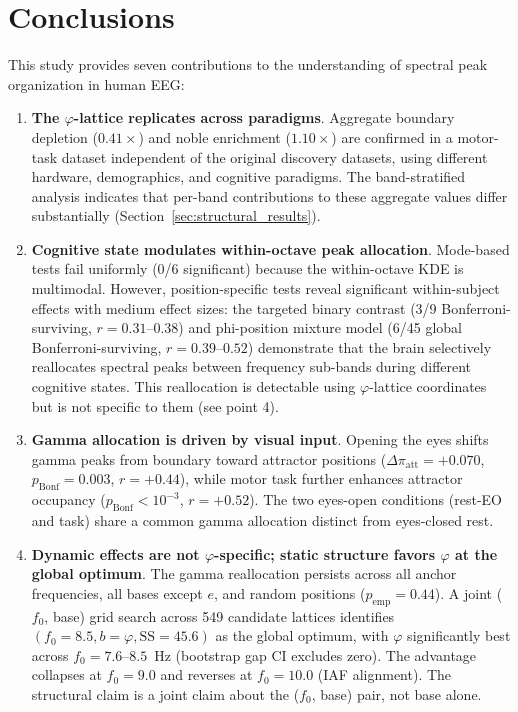 \documentclass[11pt,a4paper]{article}
\newcommand{\phisym}{\varphi}
\newcommand{\fzero}{f_0}
\begin{document}
\section{Conclusions}
\label{sec:conclusions}

This study provides seven contributions to the understanding of spectral peak organization in human EEG:

\begin{enumerate}
    \item \textbf{The $\phisym$-lattice replicates across paradigms}. Aggregate boundary depletion ($0.41\times$) and noble enrichment ($1.10\times$) are confirmed in a motor-task dataset independent of the original discovery datasets, using different hardware, demographics, and cognitive paradigms. The band-stratified analysis indicates that per-band contributions to these aggregate values differ substantially (Section~\ref{sec:structural_results}).

    \item \textbf{Cognitive state modulates within-octave peak allocation}. Mode-based tests fail uniformly (0/6 significant) because the within-octave KDE is multimodal. However, position-specific tests reveal significant within-subject effects with medium effect sizes: the targeted binary contrast (3/9 Bonferroni-surviving, $r = 0.31$--$0.38$) and phi-position mixture model (6/45 global Bonferroni-surviving, $r = 0.39$--$0.52$) demonstrate that the brain selectively reallocates spectral peaks between frequency sub-bands during different cognitive states. This reallocation is detectable using $\phisym$-lattice coordinates but is not specific to them (see point 4).

    \item \textbf{Gamma allocation is driven by visual input}. Opening the eyes shifts gamma peaks from boundary toward attractor positions ($\Delta\pi_{\text{att}} = +0.070$, $p_{\text{Bonf}} = 0.003$, $r = +0.44$), while motor task further enhances attractor occupancy ($p_{\text{Bonf}} < 10^{-3}$, $r = +0.52$). The two eyes-open conditions (rest-EO and task) share a common gamma allocation distinct from eyes-closed rest.

    \item \textbf{Dynamic effects are not $\phisym$-specific; static structure favors $\phisym$ at the global optimum}. The gamma reallocation persists across all anchor frequencies, all bases except $e$, and random positions ($p_{\text{emp}} = 0.44$). A joint ($\fzero$, base) grid search across 549 candidate lattices identifies $(\fzero = 8.5, b = \phisym, \text{SS} = 45.6)$ as the global optimum, with $\phisym$ significantly best across $\fzero = 7.6$--$8.5$~Hz (bootstrap gap CI excludes zero). The advantage collapses at $\fzero = 9.0$ and reverses at $\fzero = 10.0$ (IAF alignment). The structural claim is a joint claim about the ($\fzero$, base) pair, not base alone.


\end{enumerate}
\end{document}

